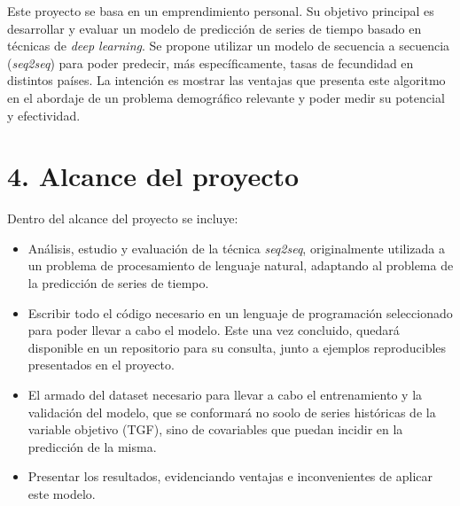 \documentclass[
11pt, %
]{charter}
\begin{document}
Este proyecto se basa en un emprendimiento personal. Su objetivo principal es desarrollar y evaluar un modelo de predicción de series de tiempo basado en técnicas de \textit{deep learning}. Se propone utilizar un modelo de secuencia a secuencia (\textit{seq2seq}) para poder predecir, más específicamente, tasas de fecundidad en distintos países. La intención es mostrar las ventajas que presenta este algoritmo en el abordaje de un problema demográfico relevante y poder medir su potencial y efectividad.

\section{4. Alcance del proyecto}
\label{sec:alcance}

%
%
%
%	
%
%

Dentro del alcance del proyecto se incluye:

\begin{itemize}
	\item Análisis, estudio y evaluación de la técnica \textit{seq2seq}, originalmente utilizada a un problema de procesamiento de lenguaje natural, adaptando al problema de la predicción de series de tiempo.
	\item Escribir todo el código necesario en un lenguaje de programación seleccionado para poder llevar a cabo el modelo. Este una vez concluido, quedará disponible en un repositorio para su consulta, junto a ejemplos reproducibles presentados en el proyecto.
	\item El armado del dataset necesario para llevar a cabo el entrenamiento y la validación del modelo, que se conformará no soolo de series históricas de la variable objetivo (TGF), sino de covariables que puedan incidir en la predicción de la misma.
	\item Presentar los resultados, evidenciando ventajas e inconvenientes de aplicar este modelo.
\end{itemize}
\end{document}
